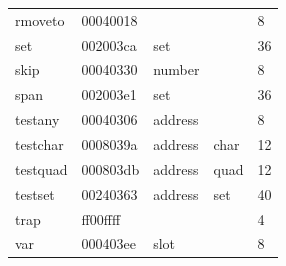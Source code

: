 \begin{center}
\begin{longtable}{lllll}
rmoveto & 00040018 &  &   & 8 \\
set & 002003ca & set &   & 36 \\
skip & 00040330 & number &   & 8 \\
span & 002003e1 & set &   & 36 \\
testany & 00040306 & address &   & 8 \\
testchar & 0008039a & address & char  & 12 \\
testquad & 000803db & address & quad  & 12 \\
testset & 00240363 & address & set  & 40 \\
trap & ff00ffff &  &   & 4 \\
var & 000403ee & slot &   & 8 \\
\end{longtable}
\end{center}
